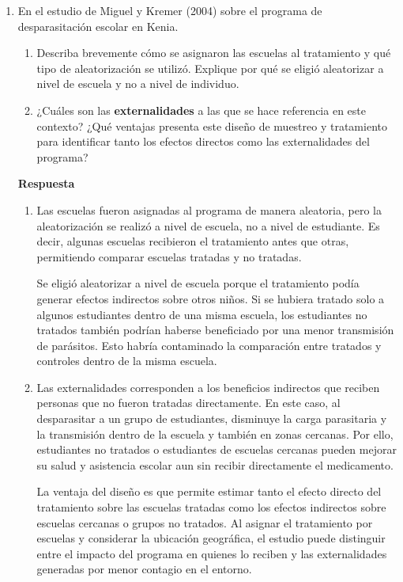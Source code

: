 \documentclass[letterpaper,11pt]{article}
\begin{document}
\begin{enumerate}
\item En el estudio de Miguel y Kremer (2004) sobre el programa de desparasitación escolar en Kenia.
   


\begin{enumerate}
    \item Describa brevemente cómo se asignaron las escuelas al tratamiento y qué tipo de aleatorización se utilizó. Explique por qué se eligió aleatorizar a nivel de escuela y no a nivel de individuo.

    \item  ¿Cuáles son las \textbf{externalidades} a las que se hace referencia en este contexto? 
	 ¿Qué ventajas presenta este diseño de muestreo y tratamiento para identificar tanto los efectos directos como las externalidades del programa?
\end{enumerate}

\textbf{Respuesta}

\begin{enumerate}
    \item Las escuelas fueron asignadas al programa de manera aleatoria, pero la aleatorización se realizó a nivel de escuela, no a nivel de estudiante. Es decir, algunas escuelas recibieron el tratamiento antes que otras, permitiendo comparar escuelas tratadas y no tratadas.
    
    Se eligió aleatorizar a nivel de escuela porque el tratamiento podía generar efectos indirectos sobre otros niños. Si se hubiera tratado solo a algunos estudiantes dentro de una misma escuela, los estudiantes no tratados también podrían haberse beneficiado por una menor transmisión de parásitos. Esto habría contaminado la comparación entre tratados y controles dentro de la misma escuela.
    
    \item Las externalidades corresponden a los beneficios indirectos que reciben personas que no fueron tratadas directamente. En este caso, al desparasitar a un grupo de estudiantes, disminuye la carga parasitaria y la transmisión dentro de la escuela y también en zonas cercanas. Por ello, estudiantes no tratados o estudiantes de escuelas cercanas pueden mejorar su salud y asistencia escolar aun sin recibir directamente el medicamento.
    
    La ventaja del diseño es que permite estimar tanto el efecto directo del tratamiento sobre las escuelas tratadas como los efectos indirectos sobre escuelas cercanas o grupos no tratados. Al asignar el tratamiento por escuelas y considerar la ubicación geográfica, el estudio puede distinguir entre el impacto del programa en quienes lo reciben y las externalidades generadas por menor contagio en el entorno.
\end{enumerate}

\end{enumerate}
\end{document}
